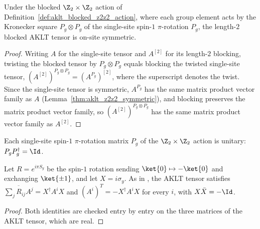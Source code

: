 \begin{lemma}\label{thm:aklt_blocked_z2z2_symmetric}
    \leanok
    Under the blocked $\Z_2 \times \Z_2$ action of
    Definition~\ref{def:aklt_blocked_z2z2_action}, where each group element
    acts by the Kronecker square $P_g \otimes P_g$ of the single-site spin-$1$
    $\pi$-rotation $P_g$, the length-$2$ blocked AKLT tensor is on-site
    symmetric.
\end{lemma}
\begin{proof}
    \leanok
    Writing $A$ for the single-site tensor and $A^{[2]}$ for its length-$2$
    blocking, twisting the blocked tensor by $P_g \otimes P_g$ equals blocking
    the twisted single-site tensor,
    $(A^{[2]})^{P_g \otimes P_g} = (A^{P_g})^{[2]}$, where the superscript
    denotes the twist. Since the single-site tensor is symmetric, $A^{P_g}$ has
    the same matrix product vector family as $A$
    (Lemma~\ref{thm:aklt_z2z2_symmetric}), and blocking preserves the matrix
    product vector family, so $(A^{[2]})^{P_g \otimes P_g}$ has the same matrix
    product vector family as $A^{[2]}$.
\end{proof}

\begin{lemma}\label{thm:aklt_unitary_z2z2}
    \leanok
    Each single-site spin-$1$ $\pi$-rotation matrix $P_g$ of the
    $\Z_2 \times \Z_2$ action is unitary: $P_g P_g^\dagger = \Id$.
\end{lemma}

\begin{lemma}
    \label{thm:aklt_time_reversal_reflection}
    \leanok
    Let $R=e^{i\pi S_y}$ be the spin-$1$ rotation sending $\ket{0}\mapsto-\ket{0}$
    and exchanging $\ket{\pm1}$, and let $X=i\sigma_y$. As in
    \cite[Section~III.A]{Cirac2021Matrix}, the AKLT tensor satisfies
    $\overline{\sum_jR_{ij}A^j}=X^\dagger A^iX$ and $(A^i)^{T}=-X^\dagger A^iX$ for
    every $i$, with $X\bar X=-\Id$.
\end{lemma}
\begin{proof}
    \leanok
    Both identities are checked entry by entry on the three matrices of the AKLT
    tensor, which are real.
\end{proof}


